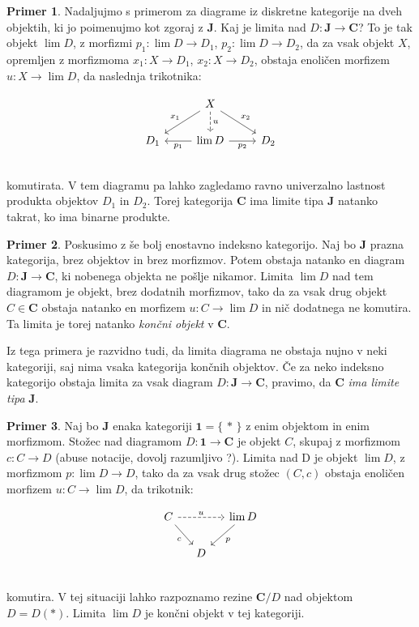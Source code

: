 \documentclass[12pt,a4paper]{book}
\theoremstyle{definition}
\theoremstyle{plain}
\theoremstyle{definition}
\newtheorem{primer}{Primer}[section]
\theoremstyle{remark}
\newcommand{\cat}[1]{\textbf{#1}}
\renewcommand{\set}[1]{\{\,#1\,\}}
\begin{document}
\begin{primer}
Nadaljujmo s primerom za diagrame iz diskretne kategorije na dveh objektih, ki jo poimenujmo kot zgoraj z $\cat{J}$. Kaj je limita nad $D : \cat{J} \to \cat{C}$? To je tak objekt $\lim D$, z morfizmi $p_1 : \lim D \to D_1$, $p_2 : \lim D \to D_2$, da za vsak objekt $X$, opremljen z morfizmoma $x_1 : X \to D_1$, $x_2 : X \to D_2$, obstaja enoličen morfizem $u : X \to \lim D$, da naslednja trikotnika:

$$\begin{tikzcd}
& X \ar[dl, "x_1"'] \ar[d, dashed, "u"] \ar[dr, "x_2"] & \\
D_1 & \lim D \ar[l, "p_1"] \ar[r, "p_2"'] & D_2 \\
\end{tikzcd}$$
komutirata. V tem diagramu pa lahko zagledamo ravno univerzalno lastnost produkta objektov $D_1$ in $D_2$. Torej kategorija $\cat{C}$ ima limite tipa $\cat{J}$ natanko takrat, ko ima binarne produkte.

\end{primer}

\begin{primer}
Poskusimo z še bolj enostavno indeksno kategorijo. Naj bo $\cat{J}$ prazna kategorija, brez objektov in brez morfizmov. Potem obstaja natanko en diagram $D : \cat{J} \to \cat{C}$, ki nobenega objekta ne pošlje nikamor. Limita $\lim D$ nad tem diagramom je objekt, brez dodatnih morfizmov, tako da za vsak drug objekt $C \in \cat{C}$ obstaja natanko en morfizem $u : C \to \lim D$ in nič dodatnega ne komutira. Ta limita je torej natanko \emph{končni objekt} v $\cat{C}$.
\end{primer}
Iz tega primera je razvidno tudi, da limita diagrama ne obstaja nujno v neki kategoriji, saj nima vsaka kategorija končnih objektov. Če za neko indeksno kategorijo obstaja limita za vsak diagram $D : \cat{J} \to \cat{C}$, pravimo, da $\cat{C}$ \emph{ima limite tipa} $\cat{J}$.

\begin{primer}
Naj bo $\cat{J}$ enaka kategoriji $\cat{1} = \set{\ast}$ z enim objektom in enim morfizmom. Stožec nad diagramom $D : \cat{1} \to \cat{C}$ je objekt $C$, skupaj z morfizmom $c : C \to D$ (abuse notacije, dovolj razumljivo ?). Limita nad D je objekt $\lim D$, z morfizmom $p : \lim D \to D$, tako da za vsak drug stožec $(C, c)$ obstaja enoličen morfizem $u : C \to \lim D$, da trikotnik:

$$\begin{tikzcd}[column sep=small]
C \ar[dr, "c"'] \ar[rr, dashed, "u"] & & \lim D \ar[dl, "p"] \\
& D & \\
\end{tikzcd}$$
komutira. V tej situaciji lahko razpoznamo rezine $\cat{C}/D$ nad objektom $D = D(\ast)$. Limita $\lim D$ je končni objekt v tej kategoriji.
\end{primer}
\end{document}
